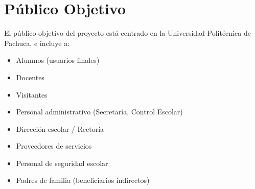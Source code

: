 \section{Público Objetivo}


El público objetivo del proyecto está centrado en la Universidad Politécnica de Pachuca, e incluye a:

\begin{itemize}
\item Alumnos (usuarios finales)
\item Docentes
\item Visitantes
\item Personal administrativo (Secretaría, Control Escolar)
\item Dirección escolar / Rectoría
\item Proveedores de servicios
\item Personal de seguridad escolar
\item Padres de familia (beneficiarios indirectos)
\end{itemize}